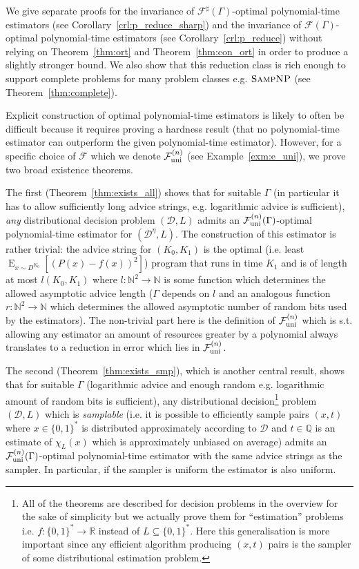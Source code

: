 \documentclass[11pt]{article}
\numberwithin{equation}{section}
\theoremstyle{definition}
\theoremstyle{plain}
\newcommand{\Bool}{\{0,1\}}
\newcommand{\Words}{{\Bool^*}}
\DeclareMathOperator{\E}{E}
\newcommand{\Nats}{\mathbb{N}}
\newcommand{\Rats}{\mathbb{Q}}
\newcommand{\Reals}{\mathbb{R}}
\newcommand{\Dist}{\mathcal{D}}
\newcommand{\Fall}{\mathcal{F}}
\newcommand{\EG}{\Fall(\Gamma)}
\newcommand{\ESG}{\Fall^\sharp(\Gamma)}
\newcommand{\FallU}{{\Fall_{\textnormal{uni}}^{(n)}}}
\begin{document}
We give separate proofs for the invariance of ${\ESG}$-optimal polynomial-time estimators (see Corollary~\ref{crl:p_reduce_sharp}) and the invariance of ${\EG}$-optimal polynomial-time estimators (see Corollary~\ref{crl:p_reduce}) without relying on Theorem~\ref{thm:ort} and Theorem~\ref{thm:con_ort} in order to produce a slightly stronger bound. We also show that this reduction class is rich enough to support complete problems for many problem classes e.g. ${\textsc{SampNP}}$ (see Theorem~\ref{thm:complete}).

Explicit construction of optimal polynomial-time estimators is likely to often be difficult because it requires proving a hardness result (that no polynomial-time estimator can outperform the given polynomial-time estimator). However, for a specific choice of ${\Fall}$ which we denote ${\FallU}$ (see Example~\ref{exm:e_uni}), we prove two broad existence theorems.

The first (Theorem~\ref{thm:exists_all}) shows that for suitable ${\Gamma}$ (in particular it has to allow sufficiently long advice strings, e.g. logarithmic advice is sufficient), \emph{any} distributional decision problem ${(\Dist,L)}$ admits an ${\FallU(\Gamma)}$-optimal polynomial-time estimator for ${(\Dist^\eta,L)}$. The construction of this estimator is rather trivial: the advice string for ${(K_0,K_1)}$ is the optimal (i.e. least ${\E_{x \sim D^{K_0}}[(P(x)-f(x))^2]}$) program that runs in time ${K_1}$ and is of length at most ${l(K_0,K_1)}$ where ${l: \Nats^2 \rightarrow \Nats}$ is some function which determines the allowed asymptotic advice length (${\Gamma}$ depends on ${l}$ and an analogous function ${r: \Nats^2 \rightarrow \Nats}$ which determines the allowed asymptotic number of random bits used by the estimators). The non-trivial part here is the definition of ${\FallU}$ which is s.t. allowing any estimator an amount of resources greater by a polynomial always translates to a reduction in error which lies in ${\FallU}$.

The second (Theorem~\ref{thm:exists_smp}), which is another central result, shows that for suitable ${\Gamma}$ (logarithmic advice and enough random e.g. logarithmic amount of random bits is sufficient), any distributional decision\footnote{All of the theorems are described for decision problems in the overview for the sake of simplicity but we actually prove them for \enquote{estimation} problems i.e. ${f: \Words \rightarrow \Reals}$ instead of ${L \subseteq \Words}$. Here this generalisation is more important since any efficient algorithm producing ${(x,t)}$ pairs is the sampler of some distributional estimation problem.} problem ${(\Dist,L)}$ which is \emph{samplable} (i.e. it is possible to efficiently sample pairs ${(x,t)}$ where ${x \in \Words}$ is distributed approximately according to ${\Dist}$ and ${t \in \Rats}$ is an estimate of ${\chi_L(x)}$ which is approximately unbiased on average) admits an ${\FallU(\Gamma)}$-optimal polynomial-time estimator with the same advice strings as the sampler. In particular, if the sampler is uniform the estimator is also uniform.
\end{document}
